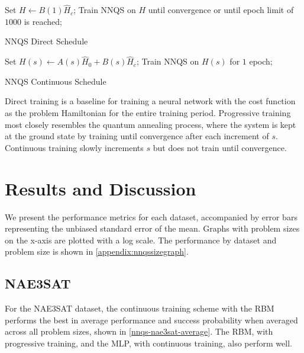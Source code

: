 \begin{algorithm}
    \begin{algorithmic}
    \State Set $H \leftarrow B(1)\hat{H}_c$;
    \State Train NNQS on $H$ until convergence or until epoch limit of $1000$ is reached;
    \end{algorithmic}
    \caption{NNQS Direct Schedule}
    \label{alg:direct}
\end{algorithm}

\begin{algorithm}
    \begin{algorithmic}
    \State Set $H(s) \leftarrow A(s)\hat{H}_0 + B(s)\hat{H}_c$;
    \State Train NNQS on $H(s)$ for $1$ epoch;
    \EndFor
    \end{algorithmic}
    \caption{NNQS Continuous Schedule}
    \label{alg:continuous}
\end{algorithm}

Direct training is a baseline for training a neural network with the cost function as the problem Hamiltonian for the entire training period. Progressive training most closely resembles the quantum annealing process, where the system is kept at the ground state by training until convergence after each increment of $s$. Continuous training slowly increments $s$ but does not train until convergence.

\section{Results and Discussion}
We present the performance metrics for each dataset, accompanied by error bars representing the unbiased standard error of the mean. Graphs with problem sizes on the x-axis are plotted with a log scale. The performance by dataset and problem size is shown in \autoref{appendix:nnqssizegraph}.

\subsection{NAE3SAT}
For the NAE3SAT dataset, the continuous training scheme with the RBM performs the best in average performance and success probability when averaged across all problem sizes, shown in \autoref{nnqs-nae3sat-average}. The RBM, with progressive training, and the MLP, with continuous training, also perform well.

